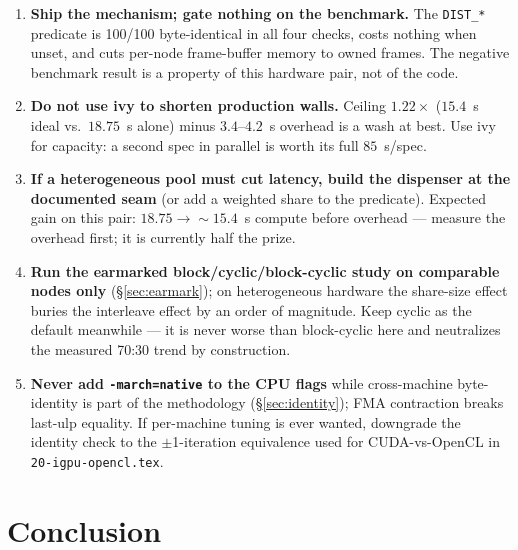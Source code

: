 \documentclass[
	english,
	letterpaper, oneside
]{article}
\begin{document}
\begin{enumerate}
  \item \textbf{Ship the mechanism; gate nothing on the benchmark.} The
        \texttt{DIST\_*} predicate is 100/100 byte-identical in all four
        checks, costs nothing when unset, and cuts per-node frame-buffer
        memory to owned frames. The negative benchmark result is a property
        of this hardware pair, not of the code.
  \item \textbf{Do not use ivy to shorten production walls.} Ceiling
        $1.22\times$ ($15.4$~s ideal vs.\ $18.75$~s alone) minus
        $3.4$--$4.2$~s overhead is a wash at best. Use ivy for capacity:
        a second spec in parallel is worth its full $85$~s/spec.
  \item \textbf{If a heterogeneous pool must cut latency, build the
        dispenser at the documented seam} (or add a weighted share to the
        predicate). Expected gain on this pair: $18.75 \to \sim$$15.4$~s
        compute before overhead --- measure the overhead first; it is
        currently half the prize.
  \item \textbf{Run the earmarked block/cyclic/block-cyclic study on
        comparable nodes only} (\S\ref{sec:earmark}); on heterogeneous
        hardware the share-size effect buries the interleave effect by an
        order of magnitude. Keep cyclic as the default meanwhile --- it is
        never worse than block-cyclic here and neutralizes the measured
        70:30 trend by construction.
  \item \textbf{Never add \texttt{-march=native} to the CPU flags} while
        cross-machine byte-identity is part of the methodology
        (\S\ref{sec:identity}); FMA contraction breaks last-ulp equality.
        If per-machine tuning is ever wanted, downgrade the identity check
        to the $\pm$1-iteration equivalence used for CUDA-vs-OpenCL in
        \texttt{20-igpu-opencl.tex}.
\end{enumerate}

\section{Conclusion}
\label{sec:conclusion}
\end{document}
